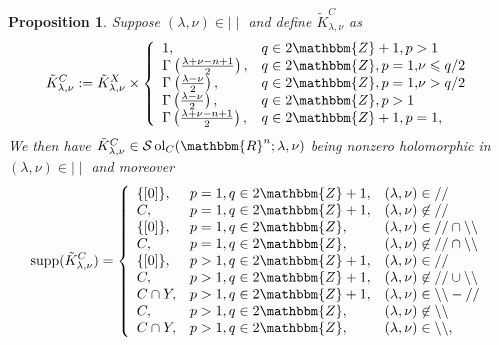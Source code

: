\documentclass[12pt]{article}
\newcommand{\assign}{:=}
\newcommand{\comma}{{,}}
\newcommand{\nin}{\not\in}
\newcommand{\tmop}[1]{\ensuremath{\operatorname{#1}}}
\newtheorem{proposition}{Proposition}[section]
\theoremstyle{remark}
\begin{document}
\begin{proposition}
  \label{supp-sing:prop-supp-C}Suppose $(\lambda, \nu) \in \mid \mid$ and
  define $\tilde{K}_{\lambda, \nu}^C$ as
  \[ \tilde{K}^C_{\lambda, \nu} \assign \tilde{K}_{\lambda, \nu}^X \times
     \left\{ \begin{array}{ll}
       1, & q \in 2\mathbbm{Z}+ 1, p > 1\\
       \Gamma^{} \left( \frac{\lambda + \nu - n + 1}{2} \right), & q \in
       2\mathbbm{Z}, p = 1 \comma \nu \leqslant q / 2\\
       \Gamma^{} \left( \frac{\lambda - \nu}{2} \right), & q \in 2\mathbbm{Z},
       p = 1 \comma \nu > q / 2\\
       \Gamma \left( \frac{\lambda - \nu}{2} \right), & q \in 2\mathbbm{Z}, p
       > 1\\
       \Gamma \left( \frac{\lambda + \nu - n + 1}{2} \right), & q \in
       2\mathbbm{Z}+ 1, p = 1,
     \end{array} \right. \]
  We then have $\tilde{K}^C_{\lambda, \nu} \in \mathcal{S} \tmop{ol}_C
  (\mathbbm{R}^n ; \lambda, \nu)$ being nonzero holomorphic in $ (\lambda,
  \nu) \in \mid \mid$ and moreover
  \[ \tmop{supp} (\tilde{K}_{\lambda, \nu}^C) = \left\{ \begin{array}{lll}
       \{ [0] \}, & p = 1, q \in 2\mathbbm{Z}+ 1, & (\lambda, \nu) \in / /\\
       C, & p = 1, q \in 2\mathbbm{Z}+ 1, & (\lambda, \nu) \nin / /\\
       \{ [0] \}, & p = 1, q \in 2\mathbbm{Z}, & (\lambda, \nu) \in / / \cap
       \backslash\backslash\\
       C, & p = 1, q \in 2\mathbbm{Z}, & (\lambda, \nu) \nin / / \cap
       \backslash\backslash\\
       \{ [0] \}, & p > 1, q \in 2\mathbbm{Z}+ 1, & (\lambda, \nu) \in / /\\
       C, & p > 1, q \in 2\mathbbm{Z} + 1, & (\lambda, \nu) \nin / / \cup
       \backslash\backslash\\
       C \cap Y, & p > 1, q \in 2\mathbbm{Z} + 1, & (\lambda, \nu) \in
       \backslash\backslash - / /\\
       C, & p > 1, q \in 2\mathbbm{Z}, & (\lambda, \nu) \nin
       \backslash\backslash\\
       C \cap Y, & p > 1, q \in 2\mathbbm{Z}, & (\lambda, \nu) \in
       \backslash\backslash,
     \end{array} \right. \]
\end{proposition}
\end{document}
